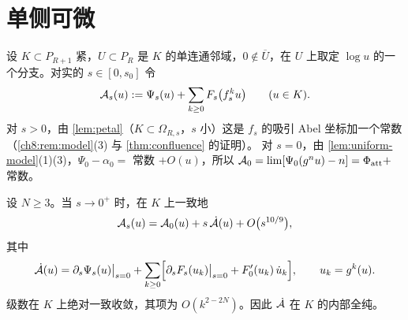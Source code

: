 \section{单侧可微}\label{ch8:sec:diff}

设 $K\subset P_{R+1}$ 紧，$U\subset P_R$ 是 $K$ 的单连通邻域，$0\notin\overline U$，在 $U$ 上取定 $\log u$ 的一个分支。对实的 $s\in[0,s_0]$ 令
\[
 \mathcal A_s(u):=\Psi_s(u)+\sum_{k\ge0}F_s\bigl(f_s^ku\bigr)\qquad(u\in K).
\]
对 $s>0$，由 \cref{lem:petal}（$K\subset\Omega_{R,s}$，$s$ 小）这是 $f_s$ 的吸引 Abel 坐标加一个常数（\cref{ch8:rem:model}(3) 与 \cref{thm:confluence} 的证明）。
对 $s=0$，由 \cref{lem:uniform-model}(1)(3)，$\Psi_0-\alpha_0=$ 常数 $+O(u)$，所以 $\mathcal A_0=\lim[\Psi_0(g^nu)-n]=\Phi_{\mathrm{att}}+$ 常数。

\begin{proposition}[单侧可微]\label{ch8:prop:diff}
设 $N\ge3$。当 $s\to0^+$ 时，在 $K$ 上一致地
\[
 \mathcal A_s(u)=\mathcal A_0(u)+s\,\dot{\mathcal A}(u)+O\bigl(s^{10/9}\bigr),
\]
其中
\begin{equation}\label{ch8:eq:Adot}
 \dot{\mathcal A}(u)=\partial_s\Psi_s(u)\big|_{s=0}+\sum_{k\ge0}\Bigl[\partial_sF_s(u_k)\big|_{s=0}+F_0'(u_k)\,\dot u_k\Bigr],\qquad u_k=g^k(u).
\end{equation}
级数在 $K$ 上绝对一致收敛，其项为 $O(k^{2-2N})$。因此 $\dot{\mathcal A}$ 在 $K$ 的内部全纯。
\end{proposition}

